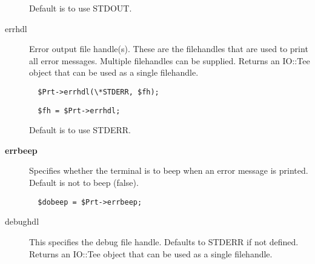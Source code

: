 \begin{description}
Default is to use STDOUT.


\item[errhdl] \mbox{}

Error output file handle(s). These are the filehandles that are used
to print all error messages. Multiple filehandles can be supplied.
Returns an IO::Tee object that can be used as a single filehandle.

\begin{verbatim}
  $Prt->errhdl(\*STDERR, $fh);
\end{verbatim}
\begin{verbatim}
  $fh = $Prt->errhdl;
\end{verbatim}


Default is to use STDERR.


\item[\textbf{errbeep}] \mbox{}

Specifies whether the terminal is to beep when an error
message is printed. Default is not to beep (false).

\begin{verbatim}
  $dobeep = $Prt->errbeep;
\end{verbatim}

\item[debughdl] \mbox{}

This specifies the debug file handle. Defaults to STDERR if not 
defined. Returns an IO::Tee object that can be used as a single
filehandle.

\end{description}

